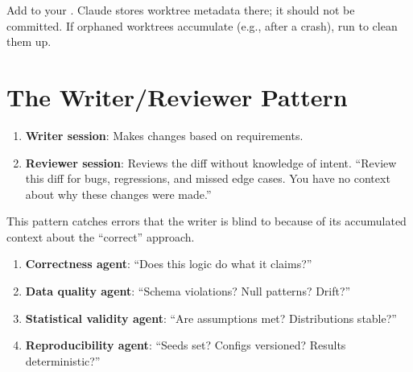 \begin{warnbox}
Add  to your .
Claude stores worktree metadata there; it should not be committed.
If orphaned worktrees accumulate (e.g., after a crash), run
 to clean them up.
\end{warnbox}


\section{The Writer/Reviewer Pattern}
\label{sec:writer-reviewer}


\begin{enumerate}
  \item \textbf{Writer session}: Makes changes based on requirements.
  \item \textbf{Reviewer session}: Reviews the diff without knowledge of intent.
    ``Review this diff for bugs, regressions, and missed edge cases.
    You have no context about why these changes were made.''
\end{enumerate}

This pattern catches errors that the writer is blind to because of
its accumulated context about the ``correct'' approach.



\begin{enumerate}
  \item \textbf{Correctness agent}: ``Does this logic do what it claims?''
  \item \textbf{Data quality agent}: ``Schema violations? Null patterns? Drift?''
  \item \textbf{Statistical validity agent}: ``Are assumptions met? Distributions stable?''
  \item \textbf{Reproducibility agent}: ``Seeds set? Configs versioned? Results deterministic?''
\end{enumerate}

